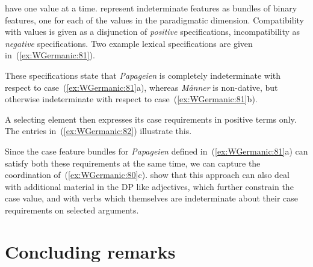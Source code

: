\documentclass[output=paper,hidelinks]{langscibook}
\begin{document}
have one value at a time. \citet{DKS:Indeterminacy} represent
indeterminate features as bundles of binary features, one for each of
the values in the paradigmatic dimension. Compatibility with values is
given as a disjunction of \textit{positive} specifications,
incompatibility as \textit{negative} specifications. Two example lexical specifications are given in~(\ref{ex:WGermanic:81}).
%
\begin{exe}
  \ex\label{ex:WGermanic:81}
  \begin{xlist}
    \ex {}
    \ex {}
  \end{xlist}
\end{exe}
%
These specifications state that \textit{Papageien} is completely
indeterminate with respect to case~(\ref{ex:WGermanic:81}a), whereas \textit{Männer} is
non-dative, but otherwise indeterminate with respect to case~(\ref{ex:WGermanic:81}b).

A selecting element then expresses its case requirements in positive terms only. The entries in~(\ref{ex:WGermanic:82}) illustrate this.
%
\begin{exe}
  \ex\label{ex:WGermanic:82}
  \begin{xlist}
    \ex {}
    \ex {}
  \end{xlist}
\end{exe}
%
%
%
Since the case feature bundles for \textit{Papageien} defined
in~(\ref{ex:WGermanic:81}a) can satisfy both these requirements at the same time,
we can capture the coordination
of~(\ref{ex:WGermanic:80}c). \citeauthor{DKS:Indeterminacy} show that this approach
can also deal with additional material in the DP like adjectives, which further
constrain the case value, and with verbs which themselves are
indeterminate about their case requirements on selected arguments.

\section{Concluding remarks}\label{sec:Germanic:conclude}\largerpage[2]
\end{document}
